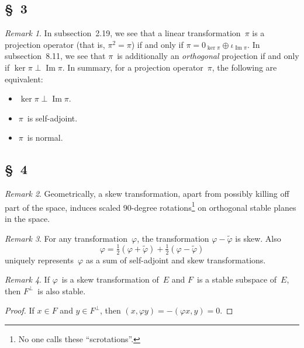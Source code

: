 \documentclass[letterpaper,12pt]{article}
\newcommand{\orth}{\perp}
\DeclareMathOperator{\im}{Im}
\newcommand{\dsum}{\oplus}
\newcommand{\oc}[1]{#1^{\perp}}
\newcommand{\iprod}[2]{(#1,#2)}
\newcommand{\adj}[1]{\widetilde{#1}}
\theoremstyle{definition}
\theoremstyle{remark}
\newtheorem*{rmk}{Remark}
\begin{document}
\subsection*{\S~3}
\begin{rmk}
In subsection~2.19, we see that a linear transformation~\(\pi\) is a projection operator (that is, \(\pi^2=\pi\)) if and only if \(\pi=0_{\ker\pi}\dsum\iota_{\im\pi}\). In subsection~8.11, we see that \(\pi\)~is additionally an \emph{orthogonal} projection if and only if \(\ker\pi\orth\im\pi\). In summary, for a projection operator~\(\pi\), the following are equivalent:
\begin{itemize}[itemsep=0pt]
\item \(\ker\pi\orth\im\pi\).
\item \(\pi\)~is self-adjoint.
\item \(\pi\)~is normal.
\end{itemize}
\end{rmk}

\subsection*{\S~4}
\begin{rmk}
Geometrically, a skew transformation, apart from possibly killing off part of the space, induces scaled 90-degree rotations\footnote{No one calls these ``scrotations''.} on orthogonal stable planes in the space.
\end{rmk}

\begin{rmk}
For any transformation~\(\varphi\), the transformation \(\varphi-\adj{\varphi}\) is skew. Also
\[\varphi=\tfrac{1}{2}(\varphi+\adj{\varphi})+\tfrac{1}{2}(\varphi-\adj{\varphi})\]
uniquely represents~\(\varphi\) as a sum of self-adjoint and skew transformations.
\end{rmk}

\begin{rmk}
If \(\varphi\)~is a skew transformation of~\(E\) and \(F\)~is a stable subspace of~\(E\), then \(\oc{F}\)~is also stable.
\end{rmk}
\begin{proof}
If \(x\in F\) and \(y\in\oc{F}\), then \(\iprod{x}{\varphi y}=-\iprod{\varphi x}{y}=0\).
\end{proof}
\end{document}
